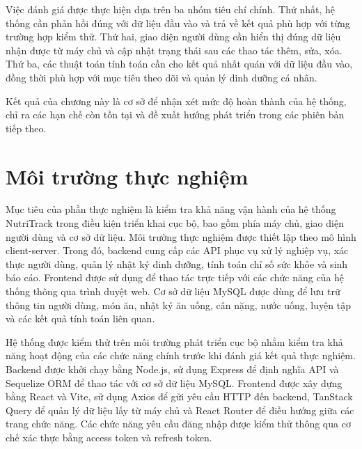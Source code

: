 \documentclass[12pt, a4paper]{report}
\begin{document}
Việc đánh giá được thực hiện dựa trên ba nhóm tiêu chí chính. Thứ nhất, hệ thống cần phản hồi đúng với dữ liệu đầu vào và trả về kết quả phù hợp với từng trường hợp kiểm thử. Thứ hai, giao diện người dùng cần hiển thị đúng dữ liệu nhận được từ máy chủ và cập nhật trạng thái sau các thao tác thêm, sửa, xóa. Thứ ba, các thuật toán tính toán cần cho kết quả nhất quán với dữ liệu đầu vào, đồng thời phù hợp với mục tiêu theo dõi và quản lý dinh dưỡng cá nhân.

Kết quả của chương này là cơ sở để nhận xét mức độ hoàn thành của hệ thống, chỉ ra các hạn chế còn tồn tại và đề xuất hướng phát triển trong các phiên bản tiếp theo.

\section{Môi trường thực nghiệm}Mục tiêu của phần thực nghiệm là kiểm tra khả năng vận hành của hệ thống NutriTrack trong điều kiện triển khai cục bộ, bao gồm phía máy chủ, giao diện người dùng và cơ sở dữ liệu. Môi trường thực nghiệm được thiết lập theo mô hình client-server. Trong đó, backend cung cấp các API phục vụ xử lý nghiệp vụ, xác thực người dùng, quản lý nhật ký dinh dưỡng, tính toán chỉ số sức khỏe và sinh báo cáo. Frontend được sử dụng để thao tác trực tiếp với các chức năng của hệ thống thông qua trình duyệt web. Cơ sở dữ liệu MySQL được dùng để lưu trữ thông tin người dùng, món ăn, nhật ký ăn uống, cân nặng, nước uống, luyện tập và các kết quả tính toán liên quan.

Hệ thống được kiểm thử trên môi trường phát triển cục bộ nhằm kiểm tra khả năng hoạt động của các chức năng chính trước khi đánh giá kết quả thực nghiệm. Backend được khởi chạy bằng Node.js, sử dụng Express để định nghĩa API và Sequelize ORM để thao tác với cơ sở dữ liệu MySQL. Frontend được xây dựng bằng React và Vite, sử dụng Axios để gửi yêu cầu HTTP đến backend, TanStack Query để quản lý dữ liệu lấy từ máy chủ và React Router để điều hướng giữa các trang chức năng. Các chức năng yêu cầu đăng nhập được kiểm thử thông qua cơ chế xác thực bằng access token và refresh token.
\end{document}
